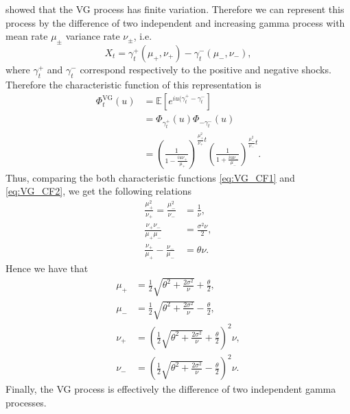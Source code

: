 \citeauthor{MCC98} \citeyearpar{MCC98} showed that the VG process has finite variation. Therefore we can represent this process by the difference of two independent and increasing gamma process with mean rate $\mu_\pm$ variance rate $\nu_\pm$, i.e.
$$X_t = \gamma_t^+(\mu_+,\nu_+)-\gamma_t^-(\mu_-,\nu_-),$$
where $\gamma^+_t$ and $\gamma^-_t$ correspond respectively to the positive and negative shocks. Therefore the characteristic function of this representation is
\begin{align}\label{eq:VG_CF2}
\Phi_t^{\text{VG}}(u)&=\mathbb{E}\left[e^{iu(\gamma_t^+-\gamma_t^-}\right]\nonumber\\
&=\Phi_{\gamma_t^+}(u)\Phi_{-\gamma_t^-}(u)\nonumber\\
&=\left(\frac{1}{1-\frac{iu\nu_+}{\mu_+}}\right)^{\frac{\mu_+^2}{\nu
_+}t}\left(\frac{1}{1+\frac{iu\nu_-}{\mu_-}}\right)^{\frac{\mu_-^2}{\nu_-}t}.
\end{align}
Thus, comparing the both characteristic functions \eqref{eq:VG_CF1} and \eqref{eq:VG_CF2}, we get the following relations
\begin{align*}
\frac{\mu_+^2}{\nu_+}=\frac{\mu_-^2}{\nu_-}&=\frac{1}{\nu},\\
\frac{\nu_+\nu_-}{\mu_+\mu_-}&=\frac{\sigma^2\nu}{2},\\
\frac{\nu_+}{\mu_+}-\frac{\nu_-}{\mu_-}&=\theta\nu.
\end{align*}
Hence we have that
\begin{align*}
\mu_+&= \frac{1}{2}\sqrt{\theta^2+\frac{2\sigma^2}{\nu}}+\frac{\theta}{2}, \\
\mu_-&= \frac{1}{2}\sqrt{\theta^2+\frac{2\sigma^2}{\nu}}-\frac{\theta}{2},\\
\nu_+&= \left(\frac{1}{2}\sqrt{\theta^2+\frac{2\sigma^2}{\nu}}+\frac{\theta}{2}\right)^2\nu,\\
\nu_-&= \left(\frac{1}{2}\sqrt{\theta^2+\frac{2\sigma^2}{\nu}}-\frac{\theta}{2}\right)^2\nu.
\end{align*}
Finally, the VG process is effectively the difference of two independent gamma processes.

